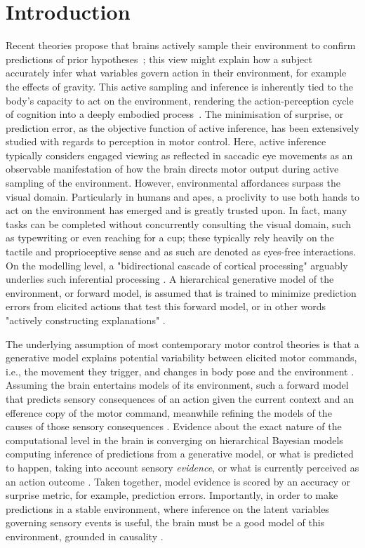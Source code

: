 \section{Introduction}
Recent theories propose that brains actively sample their environment to confirm predictions of prior hypotheses~\cites{Clark2013, Friston2010, Rao1999}; this view might explain how a subject accurately infer what variables govern action in their environment, for example the effects of gravity. This active sampling and inference is inherently tied to the body's capacity to act on the environment, rendering the action-perception cycle of cognition into a deeply embodied process~\cite{Friston2012}. The minimisation of surprise, or prediction error, as the objective function of active inference, has been extensively studied with regards to perception in motor control. Here, active inference typically considers engaged viewing as reflected in saccadic eye movements as an observable manifestation of how the brain directs motor output during active sampling of the environment. However, environmental affordances surpass the visual domain. Particularly in humans and apes, a proclivity to use both hands to act on the environment has emerged and is greatly trusted upon. In fact, many tasks can be completed without concurrently consulting the visual domain, such as typewriting or even reaching for a cup; these typically rely heavily on the tactile and proprioceptive sense and as such are denoted as eyes-free interactions. On the modelling level, a "bidirectional cascade of cortical processing" arguably underlies such inferential processing \cite{Clark2013}. A hierarchical generative model of the environment, or forward model, is assumed that is trained to minimize prediction errors from elicited actions that test this forward model, or in other words "actively constructing explanations" \cites{Wolpert2011, Friston2018}.

The underlying assumption of most contemporary motor control theories is that a generative model explains potential variability between elicited motor commands, i.e., the movement they trigger, and changes in body pose and the environment \cites{Wolpert2011, Shadmehr2010}. Assuming the brain entertains models of its environment, such a forward model that predicts sensory consequences of an action given the current context and an efference copy of the motor command, meanwhile refining the models of the causes of those sensory consequences \cites{Pearson2011, Friston2010, Friston2016a}. Evidence about the exact nature of the computational level in the brain is converging on hierarchical Bayesian models computing inference of predictions from a generative model, or what is predicted to happen, taking into account sensory \textit{evidence}, or what is currently perceived as an action outcome \cite{Knill2004, Shams2010}. Taken together, model evidence is scored by an accuracy or surprise metric, for example, prediction errors. Importantly, in order to make predictions in a stable environment, where inference on the latent variables governing sensory events is useful, the brain must be a good model of this environment, grounded in causality \cite{Friston2016a}.


